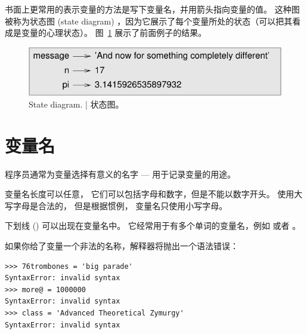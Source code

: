 书面上更常用的表示变量的方法是写下变量名，并用箭头指向变量的值。 这种图被称为状态图 (state diagram) ，因为它展示了每个变量所处的状态（可以把其看成是变量的心理状态）。 图~\ref{fig.state2} 展示了前面例子的结果。

\begin{figure}
\centerline
{\includegraphics[scale=0.8]{../source/figs/state2.pdf}}
\caption{State diagram.  |  状态图。}
\label{fig.state2}
\end{figure}

\section{变量名}


程序员通常为变量选择有意义的名字 --- 用于记录变量的用途。

变量名长度可以任意， 它们可以包括字母和数字，但是不能以数字开头。 使用大写字母是合法的， 但是根据惯例， 变量名只使用小写字母。

下划线 (\li{_}) 可以出现在变量名中。 它经常用于有多个单词的变量名，例如  或者 。
 

如果你给了变量一个非法的名称，解释器将抛出一个语法错误：

\begin{lstlisting}
>>> 76trombones = 'big parade'
SyntaxError: invalid syntax
>>> more@ = 1000000
SyntaxError: invalid syntax
>>> class = 'Advanced Theoretical Zymurgy'
SyntaxError: invalid syntax
\end{lstlisting}


